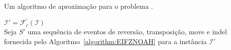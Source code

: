 \begin{algorithm}[!tbh]
  \caption{Um algoritmo de aproximação para o problema \SbFIRTMI{}.\label{algorithm:JBNSEPGG}}
  $\mathcal{I}' = \mathcal{F}_{c}^{'}(\mathcal{I})$ \\
  Seja $S'$ uma sequência de eventos de reversão, transposição, move e indel fornecida pelo Algoritmo~\ref{algorithm:EIFZNOAH} para a instância $\mathcal{I}'$ \\
\end{algorithm}